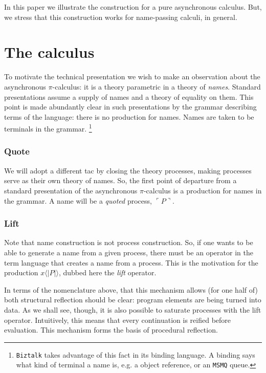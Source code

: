 \documentclass[]{amsart}
\newcommand{\lliftb}{\langle\!|}
\newcommand{\rliftb}{|\!\rangle}
\newcommand{\lpquote}{\ulcorner}
\newcommand{\rpquote}{\urcorner}
\newcommand{\lift}[2]{#1 \lliftb #2 \rliftb}
\newcommand{\quotep}[1]{\lpquote #1 \rpquote}
\theoremstyle{definition}
\theoremstyle{remark}
\numberwithin{equation}{subsection}
\newcommand{\pic}{$\pi$-calculus}
\begin{document}
In this paper we illustrate the construction for a pure asynchronous
calculus. But, we stress that this construction works for name-passing
calculi, in general. 


\section{The calculus}

To motivate the technical presentation we wish to make an observation
about the asynchronous {\pic}: it is a theory parametric in a theory
of \textit{names}. Standard presentations assume a supply of names and
a theory of equality on them. This point is made abundantly clear in
such presentations by the grammar describing terms of the language:
there is no production for names. Names are taken to be terminals in
the grammar. \footnote{ \texttt{Biztalk} takes advantage of this fact
in its binding language. A binding says what kind of terminal a name
is, e.g. a object reference, or an \texttt{MSMQ} queue.}

\subsubsection{Quote}
We will adopt a different tac by closing the theory processes, making
processes serve as their own theory of names. So, the first point of
departure from a standard presentation of the asynchronous
{\pic} is a production for names in the grammar. A name will
be a \textit{quoted} process, $\quotep{P}$. 

\subsubsection{Lift}
Note that name construction is not process construction. So, if one
wants to be able to generate a name from a given process, there must
be an operator in the term language that creates a name from a
process. This is the motivation for the production $\lift{x}{P}$,
dubbed here the \emph{lift} operator.

In terms of the nomenclature above, that this mechanism allows (for
one half of) both structural reflection should be clear: program
elements are being turned into data. As we shall see, though, it is
also possible to saturate processes with the lift
operator. Intuitively, this means that every continuation is reified
before evaluation. This mechanism forms the basis of procedural
reflection.
\end{document}
